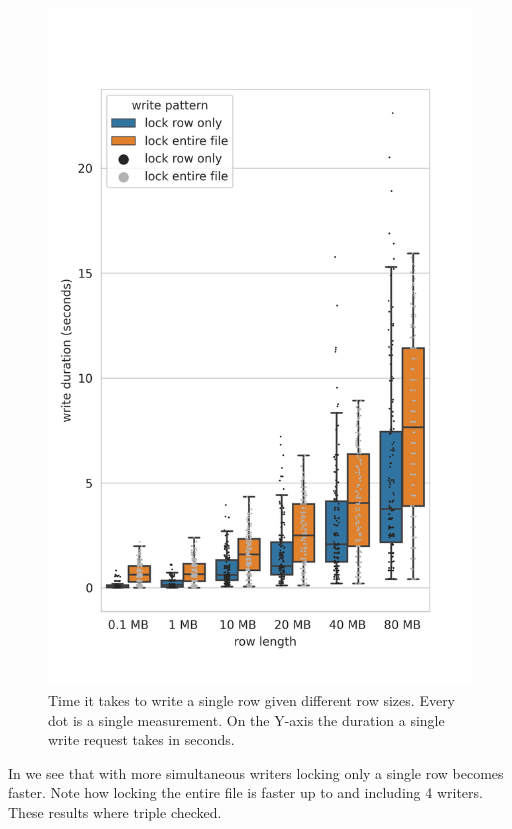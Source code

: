 \begin{figure}[htbp]
	\includegraphics[width=3\textwidth]{../results/plots/single_vs_row_len.png}
	\caption{Time it takes to write a single row given different row sizes. Every dot is a single measurement. On the Y-axis the duration a single write request takes in seconds.}
	\label{fig:single_rowlen}
\end{figure}
%
In  we see that with more simultaneous writers locking only a single row becomes faster. Note how locking the entire file is faster up to and including 4 writers. These results where triple checked.
%
